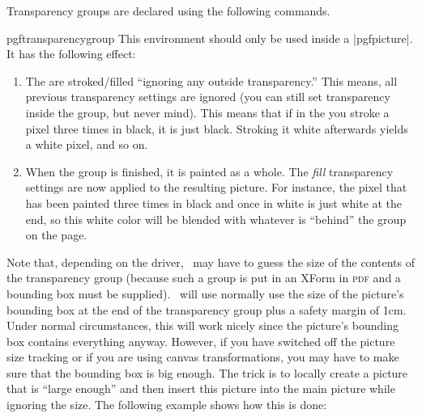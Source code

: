 Transparency groups are declared using the following commands.

\begin{environment}{{pgftransparencygroup}}
  This environment should only be used inside a |{pgfpicture}|. It has
  the following effect:
  \begin{enumerate}
  \item The  are stroked/filled
    ``ignoring any outside transparency.'' This means, all previous
    transparency settings are ignored (you can still set transparency
    inside the group, but never mind). This means that if in the
     you stroke a pixel three times in
    black, it is just black. Stroking it white afterwards yields a
    white pixel, and so on.
  \item When the group is finished, it is painted as a whole. The
    \emph{fill} transparency settings are now applied to the resulting
    picture. For instance, the pixel that has been painted three times
    in black and once in white is just white at the end, so this white
    color will be blended with whatever is ``behind'' the group on the
    page.
  \end{enumerate}

  Note that, depending on the driver, \pgfname\ may have to guess the
  size of the contents of the transparency group (because such a group
  is put in an XForm in \textsc{pdf} and a bounding box must be
  supplied). \pgfname\ will use normally use the size of the picture's
  bounding box at the end of the transparency group plus a safety
  margin of 1cm. Under normal circumstances, this will work nicely
  since the picture's bounding box contains everything
  anyway. However, if you have switched off the picture size tracking
  or if you are using canvas transformations, you may have to make
  sure that the bounding box is big enough. The trick is to locally
  create a picture that is ``large enough'' and then insert this
  picture into the main picture while ignoring the size. The following
  example shows how this is done:


{\tikzexternaldisable
{}
}%



\end{environment}
